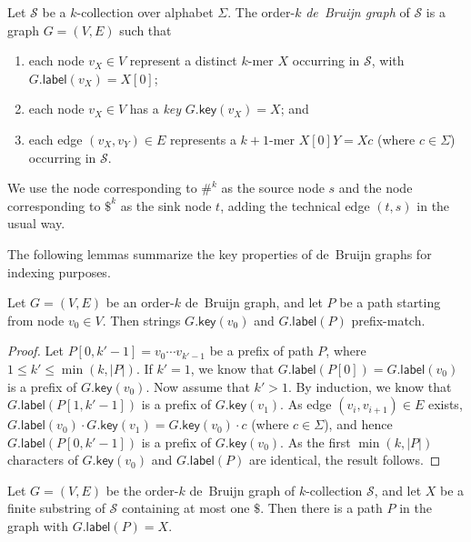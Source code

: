 \documentclass[a4paper,UKenglish]{lipics-v2016}
\newcommand{\abs}[1]{\ensuremath{\lvert #1 \rvert}}
\newcommand{\glabel}{\ensuremath{\mathsf{label}}}
\newcommand{\gkey}{\ensuremath{\mathsf{key}}}
\newcommand{\kmer}[1]{$#1$\nobreakdash-mer}
\newcommand{\kcollection}[1]{$#1$\nobreakdash-collection}
\newcommand{\orderk}[1]{order\nobreakdash-$#1$}
\begin{document}
\begin{definition}
Let $\mathcal{S}$ be a \kcollection{k} over alphabet $\Sigma$. The \orderk{k} \emph{de~Bruijn graph} of $\mathcal{S}$ is a graph $G = (V, E)$ such that
\begin{enumerate}
\item each node $v_{X} \in V$ represent a distinct \kmer{k} $X$ occurring in $\mathcal{S}$, with $G.\glabel(v_{X}) = X[0]$;
\item each node $v_{X} \in V$ has a \emph{key} $G.\gkey(v_{X}) = X$; and
\item each edge $(v_{X}, v_{Y}) \in E$ represents a \kmer{k+1} $X[0]Y = Xc$ (where $c \in \Sigma$) occurring in $\mathcal{S}$.
\end{enumerate}
We use the node corresponding to $\#^{k}$ as the source node $s$ and the node corresponding to $\$^{k}$ as the sink node $t$, adding the technical edge $(t, s)$ in the usual way.
\end{definition}

The following lemmas summarize the key properties of de~Bruijn graphs for indexing purposes.

\begin{lemma}\label{lemma:dbg-key}
Let $G = (V, E)$ be an \orderk{k} de~Bruijn graph, and let $P$ be a path starting from node $v_{0} \in V$. Then strings $G.\gkey(v_{0})$ and $G.\glabel(P)$ prefix-match.
\end{lemma}

\begin{proof}
Let $P[0, k'-1] = v_{0} \dotsm v_{k'-1}$ be a prefix of path $P$, where $1 \le k' \le \min(k, \abs{P})$.
If $k' = 1$, we know that $G.\glabel(P[0]) = G.\glabel(v_{0})$ is a prefix of $G.\gkey(v_{0})$.
Now assume that $k' > 1$. By induction, we know that $G.\glabel(P[1, k'-1])$ is a prefix of $G.\gkey(v_{1})$. As edge $(v_{i}, v_{i+1}) \in E$ exists, $G.\glabel(v_{0}) \cdot G.\gkey(v_{1}) = G.\gkey(v_{0}) \cdot c$ (where $c \in \Sigma$), and hence $G.\glabel(P[0, k'-1])$ is a prefix of $G.\gkey(v_{0})$. As the first $\min(k, \abs{P})$ characters of $G.\gkey(v_{0})$ and $G.\glabel(P)$ are identical, the result follows.
\end{proof}

\begin{lemma}\label{lemma:dbg-fn}
Let $G = (V, E)$ be the \orderk{k} de~Bruijn graph of \kcollection{k} $\mathcal{S}$, and let $X$ be a finite substring of $\mathcal{S}$ containing at most one $\$$. Then there is a path $P$ in the graph with $G.\glabel(P) = X$.
\end{lemma}
\end{document}
